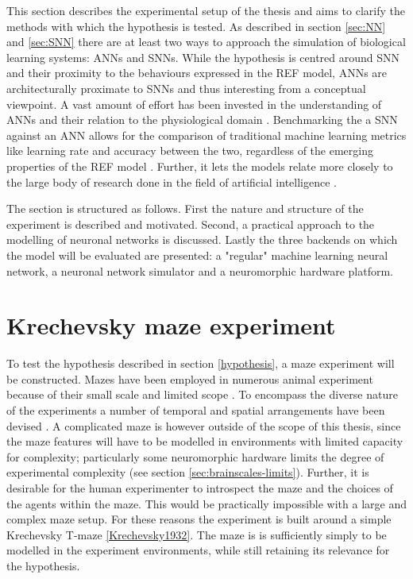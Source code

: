 This section describes the experimental setup of the thesis and aims to clarify the methods with which the hypothesis is tested.
As described in section \ref{sec:NN} and \ref{sec:SNN} there are at least two ways to approach the simulation of biological learning systems: ANNs and SNNs.
While the hypothesis is centred around SNN and their proximity to the behaviours expressed in the REF model, ANNs are architecturally proximate to SNNs and thus interesting from a conceptual viewpoint.
A vast amount of effort has been invested in the understanding of ANNs and their relation to the physiological domain \autocite{Nilsson2009, russel2007}.
Benchmarking the a SNN against an ANN allows for the comparison of traditional machine learning metrics like learning rate and accuracy between the two, regardless of the emerging properties of the REF model \autocite{schmidhuber2014, russel2007}.
Further, it lets the models relate more closely to the large body of research done in the field of artificial intelligence \autocite{Indiveri2015}.

The section is structured as follows.
First the nature and structure of the experiment is described and motivated.
Second, a practical approach to the modelling of neuronal networks is discussed.
Lastly the three backends on which the model will be evaluated are presented:
  a "regular" machine learning neural network, a neuronal network simulator and a neuromorphic hardware platform.

\section{Krechevsky maze experiment}
To test the hypothesis described in section \ref{hypothesis}, a maze experiment will be constructed.
Mazes have been employed in numerous animal experiment because of their small scale and limited scope \autocite{Krechevsky1932,Tolman1927}.
To encompass the diverse nature of the experiments a number of temporal and spatial arrangements have been devised \autocite{Tolman1927}.
A complicated maze is however outside of the scope of this thesis, since the maze features will have to be modelled in environments with limited capacity for complexity; particularly some neuromorphic hardware limits the degree of experimental complexity (see section \ref{sec:brainscales-limits}).
Further, it is desirable for the human experimenter to introspect the maze and the choices of the agents within the maze.
This would be practically impossible with a large and complex maze setup.
For these reasons the experiment is built around a simple Krechevsky T-maze \ref{Krechevsky1932}.
The maze is is sufficiently simply to be modelled in the experiment environments, while still retaining its relevance for the hypothesis.

